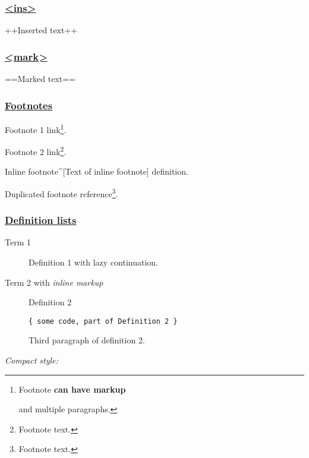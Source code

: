 \documentclass[]{article}
\begin{document}
\subsubsection{\texorpdfstring{\href{https://github.com/markdown-it/markdown-it-ins}{\textless{}ins\textgreater{}}}{\textless{}ins\textgreater{}}}\label{ins}

++Inserted text++

\subsubsection{\texorpdfstring{\href{https://github.com/markdown-it/markdown-it-mark}{\textless{}mark\textgreater{}}}{\textless{}mark\textgreater{}}}\label{mark}

==Marked text==

\subsubsection{\texorpdfstring{\href{https://github.com/markdown-it/markdown-it-footnote}{Footnotes}}{Footnotes}}\label{footnotes}

Footnote 1 link\footnote{Footnote \textbf{can have markup}

  and multiple paragraphs.}.

Footnote 2 link\footnote{Footnote text.}.

Inline footnote\^{}{[}Text of inline footnote{]} definition.

Duplicated footnote reference\footnote{Footnote text.}.

\subsubsection{\texorpdfstring{\href{https://github.com/markdown-it/markdown-it-deflist}{Definition
lists}}{Definition lists}}\label{definition-lists}

\begin{description}
\item[Term 1]
Definition 1 with lazy continuation.
\item[Term 2 with \emph{inline markup}]
Definition 2

\begin{verbatim}
{ some code, part of Definition 2 }
\end{verbatim}

Third paragraph of definition 2.
\end{description}

\emph{Compact style:}
\end{document}

